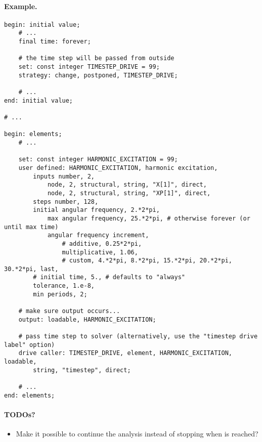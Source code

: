 \paragraph{Example.}
\begin{verbatim}
begin: initial value;
    # ...
    final time: forever;

    # the time step will be passed from outside
    set: const integer TIMESTEP_DRIVE = 99;
    strategy: change, postponed, TIMESTEP_DRIVE;

    # ...
end: initial value;

# ...

begin: elements;
    # ...

    set: const integer HARMONIC_EXCITATION = 99;
    user defined: HARMONIC_EXCITATION, harmonic excitation,
        inputs number, 2,
            node, 2, structural, string, "X[1]", direct,
            node, 2, structural, string, "XP[1]", direct,
        steps number, 128,
        initial angular frequency, 2.*2*pi,
            max angular frequency, 25.*2*pi, # otherwise forever (or until max time)
            angular frequency increment,
                # additive, 0.25*2*pi,
                multiplicative, 1.06,
                # custom, 4.*2*pi, 8.*2*pi, 15.*2*pi, 20.*2*pi, 30.*2*pi, last,
        # initial time, 5., # defaults to "always"
        tolerance, 1.e-8,
        min periods, 2;

    # make sure output occurs...
    output: loadable, HARMONIC_EXCITATION;

    # pass time step to solver (alternatively, use the "timestep drive label" option)
    drive caller: TIMESTEP_DRIVE, element, HARMONIC_EXCITATION, loadable,
        string, "timestep", direct;

    # ...
end: elements;
\end{verbatim}

\paragraph{TODOs?}
\begin{itemize}
\item Make it possible to continue the analysis instead of stopping when  is reached?
\end{itemize}
